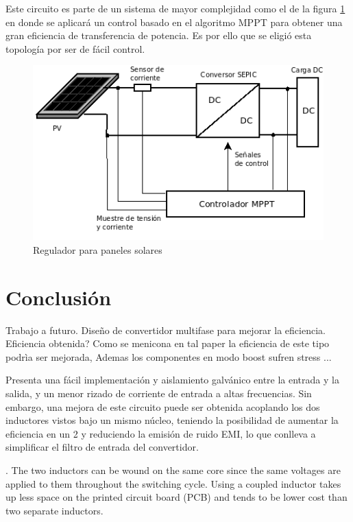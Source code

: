    Este circuito es parte de un sistema de mayor complejidad como el de la figura \ref{fig: PVControl} en donde se aplicará un control basado en el algoritmo MPPT para obtener una gran eficiencia de transferencia de potencia. Es por ello que se eligió esta topología por ser de fácil control. 
   
    \begin{figure}[htbp]
            \centering
             \includegraphics[scale = 0.35]{Figuras/Diagrama1.png}
            \caption{ Regulador para paneles solares}
            \label{fig: PVControl}
      \end{figure}

    
 
    

\section{Conclusión}

Trabajo a futuro. Diseño de convertidor multifase para mejorar la eficiencia. 
Eficiencia obtenida? 
Como se menicona en tal paper la eficiencia de este tipo podrìa ser mejorada, Ademas los componentes en modo boost sufren stress ... 

Presenta una fácil implementación y
aislamiento galvánico entre la entrada y la salida, y un menor rizado de corriente
de entrada a altas frecuencias. Sin embargo, una mejora de este circuito puede
ser obtenida acoplando los dos inductores vistos bajo un mismo núcleo, teniendo
la posibilidad de aumentar la eficiencia en un 2 y reduciendo la emisión de ruido
EMI, lo que conlleva a simplificar el filtro de entrada del convertidor.

.
The
two inductors can be wound on the same core since
the same voltages are applied to them throughout the
switching cycle. Using a coupled inductor takes up
less space on the printed circuit board (PCB) and
tends to be lower cost than two separate inductors.
 



\nocite{*}





